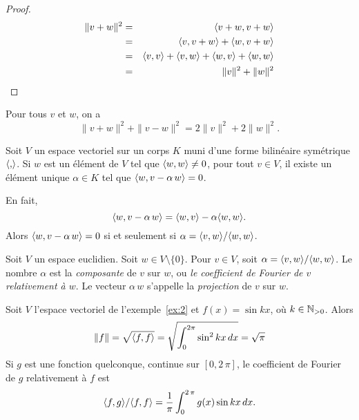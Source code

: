 \begin{proof}
  \begin{eqnarray*}
     \|v+w\|^2 &= & \langle {v+w,v+w} \rangle \\
               & = & \langle {v,v+w} \rangle + \langle {w,v+w} \rangle \\
               & = & \langle {v,v} \rangle + \langle {v,w} \rangle + \langle {w,v} \rangle + \langle {w,w} \rangle \\
               & = & \|v\|^2 + \|w\|^2
  \end{eqnarray*}
\end{proof}

\begin{proposition} Pour tous $v$ et $w$, on a 
  \begin{displaymath}
    \|v+w\|^2 + \|v-w\|^2 = 2 \|v\|^2 + 2 \|w\|^2.  
  \end{displaymath}  
\end{proposition}



Soit $V$ un espace vectoriel sur un corps $K$ muni d'une forme bilinéaire symétrique  $\langle {,} \rangle$. 
Si $w$ est un élément de $V$ tel que $\langle {w,w} \rangle \neq 0$, pour  tout $v \in V$, il existe un élément unique $\alpha \in K$ tel que $\langle {w,v -\alpha\, w} \rangle = 0$. 

En fait,
\begin{displaymath}
  \langle {w,v -\alpha\, w} \rangle = \langle {w,v} \rangle - \alpha \langle {w,w} \rangle. 
\end{displaymath}
Alors $\langle {w,v -\alpha\, w} \rangle = 0$ si et seulement si $\alpha = \langle {v,w} \rangle / \langle {w,w} \rangle$. 


\begin{definition}
  \label{def:6}
  Soit $V$ un espace euclidien. 
  Soit $w \in V \setminus \{0\}$. Pour $v \in V$, soit $\alpha = \langle {v,w} \rangle / \langle {w,w} \rangle$.  Le nombre $\alpha$ est la \emph{composante} de $v$ sur $w$, ou \emph{le coefficient de Fourier de $v$ relativement à $w$}. Le vecteur $\alpha \, w$ s'appelle la \emph{projection} de $v$ sur $w$. 
\end{definition}


\begin{example}
  \label{exe:5}
  Soit $V$ l'espace vectoriel de l'exemple~\ref{ex:2} et $f(x) = \sin kx$, où $k \in \mathbb{N}_{>0}$. Alors
  \begin{displaymath}
   \|f\| = \sqrt{\langle {f,f} \rangle} =  \sqrt{\int_0^{2\pi} \sin^2 kx \, dx} = \sqrt{\pi}
  \end{displaymath}
Si $g$ est une fonction quelconque, continue sur $[0,2\,\pi]$, le coefficient de Fourier de $g$ relativement à $f$ est 
\begin{displaymath}
  \langle {f,g} \rangle /   \langle {f,f} \rangle  = \frac{1}{\pi} \int_0^{2\, \pi} g(x) \sin kx \,dx. 
\end{displaymath}
\end{example}



